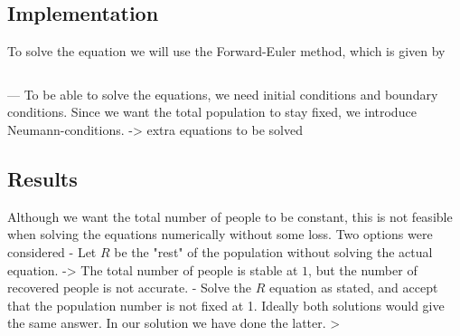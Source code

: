 \subsection{Implementation}
To solve the equation we will use the Forward-Euler method, which is given by

\begin{equation}
    
\end{equation}

---
To be able to solve the equations, we need initial conditions and boundary conditions. Since we want the total population to stay fixed, we introduce Neumann-conditions.
-> extra equations to be solved

\subsection{Results}
Although we want the total number of people to be constant, this is not feasible when solving the equations numerically without some loss. Two options were considered
- Let $R$ be the "rest" of the population without solving the actual equation. -> The total number of people is stable at $1$, but the number of recovered people is not accurate.
- Solve the $R$ equation as stated, and accept that the population number is not fixed at 1.
Ideally both solutions would give the same answer.
In our solution we have done the latter. >
